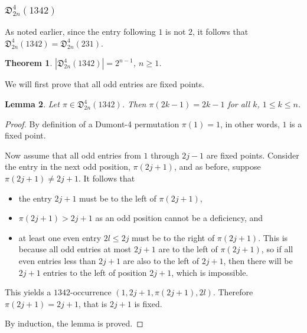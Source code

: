 \documentclass[
final
]{dmtcs-episciences}
\newtheorem{theorem}{Theorem}[section]%
\newtheorem{lemma}[theorem]{Lemma}
\theoremstyle{definition}
\theoremstyle{remark}
\begin{document}
\subsubsection{$\mathfrak{D}^4_{2n}(1342)$}

As noted earlier, since the entry following $1$ is not $2$, it follows that $\mathfrak{D}^4_{2n}(1342)=\mathfrak{D}^4_{2n}(231)$.

\begin{theorem}
\label{1342_theorem}
$|\mathfrak{D}^4_{2n}(1342)| = 2^{n-1}$,  $n \ge 1$.
\end{theorem}

We will first prove that all odd entries are fixed points.

\begin{lemma}
\label{lm:odd_fixed}
Let  $\pi \in \mathfrak{D}^4_{2n}(1342)$.  Then $\pi(2k-1) = 2k-1$ for all $k$, $1 \le k \le n$.
\end{lemma}

\begin{proof}
By definition of a Dumont-4 permutation $\pi(1)=1$, in other words, $1$ is a fixed point. 


Now assume that all odd entries from $1$ through $2j-1$ are fixed points.  Consider the entry in the next odd position, $\pi(2j+1)$, and as before, suppose $\pi(2j+1) \ne 2j+1$.  It follows that 
\begin{itemize}
\item the entry $2j+1$ must be to the left of $\pi(2j+1)$, 
\item $\pi(2j+1)>2j+1$ as an odd position cannot be a deficiency, and 
\item at least one even entry $2l\le 2j$ must be to the right of $\pi(2j+1)$. This is because all odd entries at most $2j+1$ are to the left of $\pi(2j+1)$, so if all even entries less than $2j+1$ are also to the left of $2j+1$, then there will be $2j+1$ entries to the left of position $2j+1$, which is impossible.
\end{itemize}

This yields a $1342$-occurrence $(1, 2j+1, \pi(2j+1), 2l)$.  Therefore $\pi(2j+1)=2j+1$, that is $2j+1$ is fixed.

By induction, the lemma is proved.
\end{proof}
\end{document}
